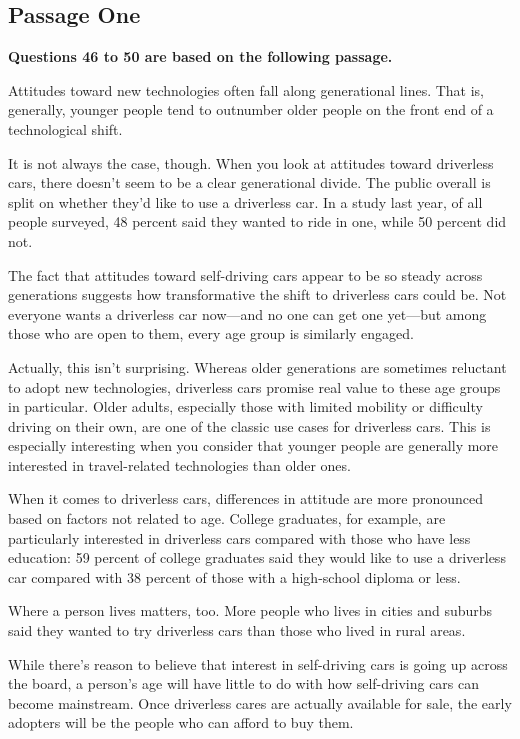 \documentclass[UTF8,11pt]{ctexart}
\begin{document}
\subsection*{\textbf{Passage One}}


\textbf{Questions 46 to 50 are based on the following passage.}


Attitudes toward new technologies often fall along generational lines. That is, generally, younger people tend to outnumber older people on the front end of a technological shift.


It is not always the case, though. When you look at attitudes toward driverless cars, there doesn’t seem to be a clear generational divide. The public overall is split on whether they’d like to use a driverless car. In a study last year, of all people surveyed, 48 percent said they wanted to ride in one, while 50 percent did not.


The fact that attitudes toward self-driving cars appear to be so steady across generations suggests how transformative the shift to driverless cars could be. Not everyone wants a driverless car now—and no one can get one yet—but among those who are open to them, every age group is similarly engaged.


Actually, this isn’t surprising. Whereas older generations are sometimes reluctant to adopt new technologies, driverless cars promise real value to these age groups in particular. Older adults, especially those with limited mobility or difficulty driving on their own, are one of the classic use cases for driverless cars. This is especially interesting when you consider that younger people are generally more interested in travel-related technologies than older ones.


When it comes to driverless cars, differences in attitude are more pronounced based on factors not related to age. College graduates, for example, are particularly interested in driverless cars compared with those who have less education: 59 percent of college graduates said they would like to use a driverless car compared with 38 percent of those with a high-school diploma or less.


Where a person lives matters, too. More people who lives in cities and suburbs said they wanted to try driverless cars than those who lived in rural areas.


While there’s reason to believe that interest in self-driving cars is going up across the board, a person’s age will have little to do with how self-driving cars can become mainstream. Once driverless cares are actually available for sale, the early adopters will be the people who can afford to buy them.
\end{document}
